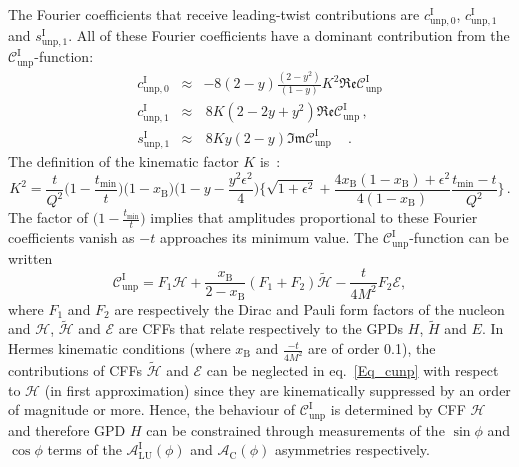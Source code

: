 \documentclass[11pt,a4paper]{article}
\begin{document}
The Fourier coefficients that receive leading-twist contributions are $c_{\textrm{unp},0}^{\textrm{I}}$, $c_{\textrm{unp},1}^{\textrm{I}}$ and $s_{\textrm{unp},1}^{\textrm{I}}$. All of these Fourier coefficients have a dominant contribution from the $\mathcal{C}_{\textrm{unp}}^{\textrm{I}}$-function:
\begin{eqnarray}
c_{\textrm{unp},0}^{\textrm{I}} &\approx&-8(2-y)\frac{(2-y^2)}{(1-y)}K^2\mathfrak{Re}\mathcal{C}_{\textrm{unp}}^{\textrm{I}}\label{eq:c0}
\\
c_{\textrm{unp},1}^{\textrm{I}} &\approx&\,8K(2- 2y + y^{2})\mathfrak{Re}\mathcal{C}_{\textrm{unp}}^{\textrm{I}}\,,\label{eq:c1}
\\
s_{\textrm{unp},1}^{\textrm{I}} &\approx&\,8Ky(2-y)\mathfrak{Im}\mathcal{C}_{\textrm{unp}}^{\textrm{I}}\quad\,. \label{eq:s1}
\end{eqnarray}
The definition of the kinematic factor $K$ is~\cite{Bel02b}:
\begin{equation}
K^2=\frac{t}{Q^2}\Big(1-\frac{t_{\textrm{min}}}{t}\Big)\Big(1-x_{\textrm{B}}\Big)\Big(1-y-\frac{y^2\epsilon^2}{4}\Big)\Big\lbrace\sqrt{1+\epsilon^2}+\frac{4x_{\textrm{B}}(1-x_{\textrm{B}})+\epsilon^2}{4(1-x_{\textrm{B}})}
\frac{t_{\textrm{min}}-t}{Q^2}\Big\rbrace\,.\label{eq:K}
\end{equation} 
The factor of $\Big(1-\frac{t_{\textrm{min}}}{t}\Big)$ implies that amplitudes proportional to these Fourier coefficients vanish as $-t$ approaches its minimum value.
The $\mathcal{C}_{\textrm{unp}}^{\textrm{I}}$-function can be
written
\cite{Bel02b} 
\begin{equation}
 \mathcal{C}_{\textrm{unp}}^{\textrm{I}} = F_{1}\mathcal{H} + \frac{x_{\textrm{B}}}{2-x_{\textrm{B}}}(F_{1}+F_{2})\widetilde{\mathcal{H}} -\frac{t}{4M^{2}}F_{2}\mathcal{E},
\label{Eq_cunp}
\end{equation}
where $F_{1}$ and $F_{2}$ are respectively the Dirac and Pauli form
factors of the nucleon and $\mathcal{H}$, $\widetilde{\mathcal{H}}$ and
$\mathcal{E}$ are CFFs that relate respectively to the GPDs $H$,
$\widetilde{H}$ and $E$.  In H{\sc ermes} kinematic
conditions (where $x_{\textrm{B}}$ and $\frac{-t}{4M^2}$ are of order 0.1), the
contributions of CFFs $\widetilde{\mathcal{H}}$ and $\mathcal{E}$ can be
neglected in eq.~\ref{Eq_cunp} with respect to $\mathcal{H}$ (in first approximation) since they
are kinematically suppressed by an order of magnitude or more.
Hence, the behaviour of
$\mathcal{C}_{\textrm{unp}}^{\textrm{I}}$ is determined by CFF $\mathcal{H}$
and therefore GPD $H$ can be constrained through
measurements of the $\sin\phi$ and $\cos\phi$ terms of the $\mathcal{A}^{\textrm{I}}_{\textrm{LU}}(\phi)$ and $\mathcal{A}_{\textrm{C}}(\phi)$ asymmetries respectively.
\end{document}
